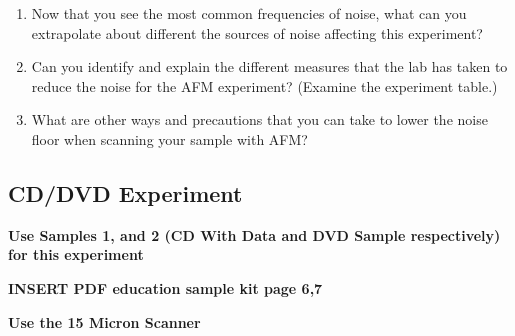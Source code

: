 \documentclass{../lab}
\begin{document}
\begin{enumerate}
\begin{itemize}
    \end{itemize}

    \item Now that you see the most common frequencies of noise, what can you extrapolate about different the sources of noise affecting this experiment?

    \item Can you identify and explain the different measures that the lab has taken to reduce the noise for the AFM experiment? (Examine the experiment table.)

    \item What are other ways and precautions that you can take to lower the noise floor when scanning your sample with AFM?

\end{enumerate}

\subsection{CD/DVD Experiment}

\textbf{Use Samples 1, and 2 (CD With Data and DVD Sample respectively) for this experiment}

\textbf{​INSERT PDF education sample kit page 6,7}

\textbf{Use the 15 Micron Scanner }
\end{document}
